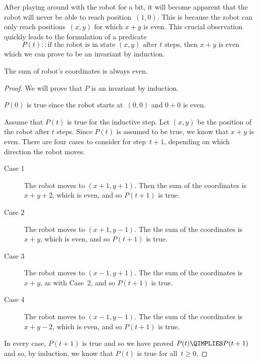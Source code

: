 After playing around with the robot for a bit, it will become apparent
that the robot will never be able to reach position~$(1, 0)$.  This is
because the robot can only reach positions~$(x, y)$ for which $x + y$
is even.  This crucial observation quickly leads to the formulation of
a predicate
\begin{equation*}
    P(t) :: \text{if the robot is in state $(x, y)$ after $t$ steps,
      then $x + y$ is even}
\end{equation*}
which we can prove to be an invariant by induction.

\begin{theorem}\label{th:diag-robot}
The sum of robot's coordinates is always even.
\end{theorem}

\begin{proof}
We will prove that $P$ is an invariant by induction.

$P(0)$ is true since the robot starts at~$(0, 0)$ and $0 + 0$ is even.

Assume that $P(t)$ is true for the inductive step.  Let $(x, y)$ be
the position of the robot after $t$ steps.  Since $P(t)$ is assumed to
be true, we know that $x + y$ is even.  There are four cases to
consider for step~$t + 1$, depending on which direction the robot
moves.
\begin{description}

\item[Case 1]
The robot moves to $(x + 1, y + 1)$.  Then the sum of the coordinates
is $x + y + 2$, which is even, and so $P(t+1)$ is true.

\item[Case 2]
The robot moves to $(x + 1, y - 1)$.  The the sum of the coordinates
is $x + y$, which is even, and so $P(t + 1)$ is true.

\item[Case 3]
The robot moves to $(x - 1, y + 1)$.  The the sum of the coordinates
is $x + y$, as with Case~2, and so $P(t + 1)$ is true.

\item[Case 4]
The robot moves to $(x - 1, y - 1)$.  The the sum of the coordinates
is $x + y - 2$, which is even, and so $P(t + 1)$ is true.

\end{description}
In every case, $P(t + 1)$ is true and so we have proved $P(t)
\QIMPLIES P(t + 1)$ and so, by induction, we know that $P(t)$ is true
for all~$t \ge 0$.
\end{proof}

